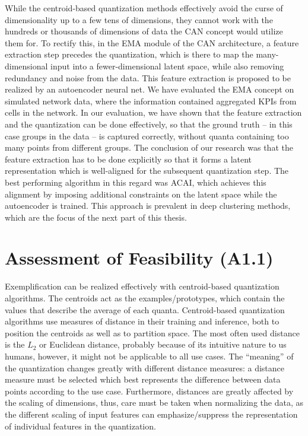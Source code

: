 	While the centroid-based quantization methods effectively avoid the curse of dimensionality up to a few tens of dimensions, they cannot work with the hundreds or thousands of dimensions of data the \ac{CAN} concept would utilize them for.
	To rectify this, in the \ac{EMA} module of the \ac{CAN} architecture, a feature extraction step precedes the quantization, which is there to map the many-dimensional input into a fewer-dimensional latent space, while also removing redundancy and noise from the data.  
	This feature extraction is proposed to be realized by an autoencoder neural net.
	We have evaluated the \ac{EMA} concept on simulated network data, where the information contained aggregated \acp{KPI} from cells in the network.
	In our evaluation, we have shown that the feature extraction and the quantization can be done effectively, so that the ground truth -- in this case groups in the data -- is captured correctly, without quanta containing too many points from different groups.
	The conclusion of our research was that the feature extraction has to be done explicitly so that it forms a latent representation which is well-aligned for the subsequent quantization step.
	The best performing algorithm in this regard was \ac{ACAI}, which achieves this alignment by imposing additional constraints on the latent space while the autoencoder is trained.
	This approach is prevalent in deep clustering methods, which are the focus of the next part of this thesis.
	
	\section{Assessment of Feasibility (A1.1)}
	
		Exemplification can be realized effectively with centroid-based quantization algorithms.
		The centroids act as the examples/prototypes, which contain the values that describe the average of each quanta. 
		Centroid-based quantization algorithms use measures of distance in their training and inference, both to position the centroids as well as to partition space.
		The most often used distance is the $L_2$ or Euclidean distance, probably because of its intuitive nature to us humans, however, it might not be applicable to all use cases.
		The ``meaning'' of the quantization changes greatly with different distance measures: a distance measure must be selected which best represents the difference between data points according to the use case.
		Furthermore, distances are greatly affected by the scaling of dimensions, thus, care must be taken when normalizing the data, as the different scaling of input features can emphasize/suppress the representation of individual features in the quantization.
		
